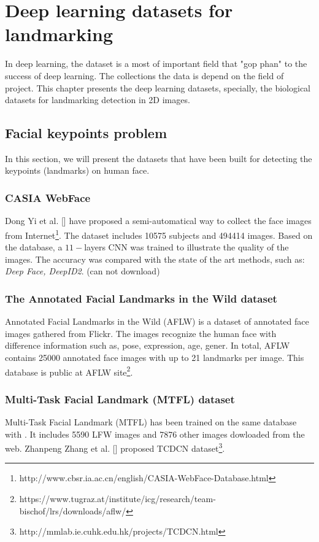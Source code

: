 \chapter{Deep learning datasets for landmarking}
In deep learning, the dataset is a most of important field that "gop phan" to the success of deep learning. The collections the data is depend on the field of project. This chapter presents the deep learning datasets, specially, the biological datasets for landmarking detection in 2D images. 
\section{Facial keypoints problem}
In this section, we will present the datasets that have been built for detecting the keypoints (landmarks) on human face.
\subsection{CASIA WebFace}
Dong Yi et al. [] have proposed a semi-automatical way to collect the face images from Internet\footnote{http://www.cbsr.ia.ac.cn/english/CASIA-WebFace-Database.html}. The dataset includes 10575 subjects and 494414 images. Based on the database, a $11-$layers CNN was trained to illustrate the quality of the images. The accuracy was compared with the state of the art methods, such as: \textit{Deep Face, DeepID2}. (can not download)

\subsection{The Annotated Facial Landmarks in the Wild dataset}
Annotated Facial Landmarks in the Wild (AFLW) \cite{koestinger11a} is a dataset of annotated face images gathered from Flickr. The images recognize the human face with difference  information such as, pose, expression, age, gener. In total, AFLW contains 25000 annotated face images with up to 21 landmarks per image. This database is public at AFLW site\footnote{https://www.tugraz.at/institute/icg/research/team-bischof/lrs/downloads/aflw/}.
\subsection{Multi-Task Facial Landmark (MTFL) dataset}
Multi-Task Facial Landmark (MTFL) has been trained on the same database with \cite{}. It includes 5590 LFW images and 7876 other images dowloaded from the web.
Zhanpeng Zhang et al. [] proposed TCDCN dataset\footnote{http://mmlab.ie.cuhk.edu.hk/projects/TCDCN.html}.
